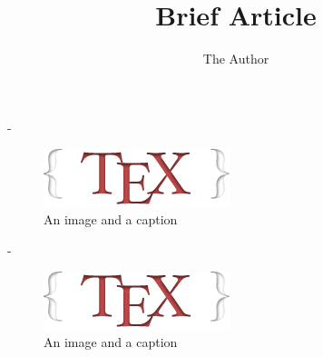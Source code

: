 \documentclass[twoside]{article}
\title{Brief Article}
\author{The Author}
\makeatletter
\newlength{\overhang}
\newenvironment{fullwidth}{%
  \begin{adjustwidth\if@twoside*\fi}{}{-\overhang}}{%
  \end{adjustwidth\if@twoside*\fi}}
\makeatother
\begin{document}
\maketitle

\lipsum[1]

\begin{fullwidth}
  \begin{multicols}{2}
    \lipsum[2]
  \end{multicols}
  \begin{figure}[htbp]
    \centering
    \includegraphics{./logo.png}
    \caption{An image and a caption}
  \end{figure}
\end{fullwidth}

\lipsum[3-4]

\begin{fullwidth}
  \lipsum[5]
  \begin{figure}[htbp]
    \centering
    \includegraphics{./logo.png}
    \caption{An image and a caption}
  \end{figure}
  \begin{multicols}{2}
    \lipsum[6]
  \end{multicols}
\end{fullwidth}

\lipsum[7]
\end{document}
